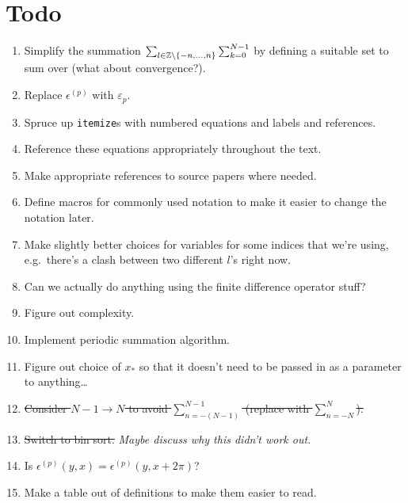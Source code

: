 \section{Todo}

\begin{enumerate}
\item Simplify the summation
  $\sum_{l \in \mathbb{Z} \backslash \left\{-n, \hdots, n\right\}}
  \sum_{k=0}^{N-1}$ by defining a suitable set to sum over (what about
  convergence?).
\item Replace $\epsilon^{(p)}$ with $\varepsilon_p$.
\item Spruce up \texttt{itemize}s with numbered equations and labels
  and references.
\item Reference these equations appropriately throughout the text.
\item Make appropriate references to source papers where needed.
\item Define macros for commonly used notation to make it easier to
  change the notation later.
\item Make slightly better choices for variables for some indices that
  we're using, e.g.\ there's a clash between two different $l$'s
  right now.
\item Can we actually do anything using the finite difference operator
  stuff?
\item Figure out complexity.
\item Implement periodic summation algorithm.
\item Figure out choice of $x_*$
  so that it doesn't need to be passed in as a parameter to
  anything\ldots
\item \st{Consider $N - 1 \longrightarrow N$
  to avoid $\sum_{n=-(N-1)}^{N-1}$ (replace with $\sum_{n=-N}^N$).}
\item \st{Switch to bin sort.} \emph{Maybe discuss why this didn't work out.}
\item Is $\epsilon^{(p)}(y,x) = \epsilon^{(p)}(y, x + 2\pi)$?
\item Make a table out of definitions to make them easier to read.
\end{enumerate}

